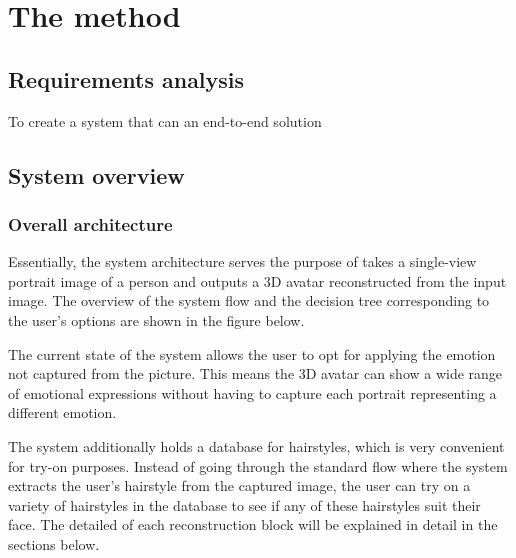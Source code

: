 \section{The method}
\label{sec:method}

\subsection{Requirements analysis}

To create a system that can an end-to-end solution



\subsection{System overview}

\subsubsection{Overall architecture}

Essentially, the system architecture serves the purpose of takes a single-view portrait image of a person and outputs a 3D avatar reconstructed from the input image. The overview of the system flow and the decision tree corresponding to the user's options are shown in the figure below.


The current state of the system allows the user to opt for applying the emotion not captured from the picture. This means the 3D avatar can show a wide range of emotional expressions without having to capture each portrait representing a different emotion.

The system additionally holds a database for hairstyles, which is very convenient for try-on purposes. Instead of going through the standard flow where the system extracts the user's hairstyle from the captured image, the user can try on a variety of hairstyles in the database to see if any of these hairstyles suit their face. The detailed of each reconstruction block will be explained in detail in the sections below.


